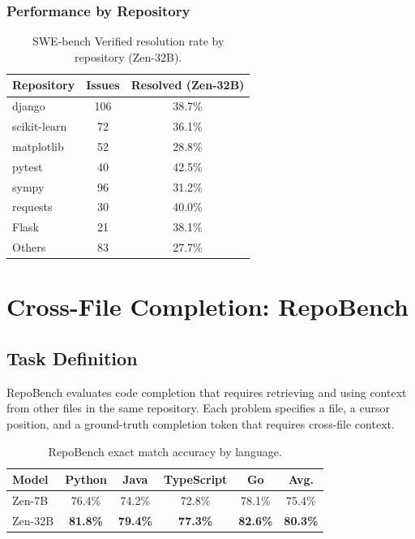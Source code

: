 \documentclass[11pt,a4paper]{article}
\begin{document}
\subsubsection{Performance by Repository}

\begin{table}[H]
\centering
\begin{tabular}{lcc}
\toprule
\textbf{Repository} & \textbf{Issues} & \textbf{Resolved (Zen-32B)} \\
\midrule
django & 106 & 38.7\% \\
scikit-learn & 72 & 36.1\% \\
matplotlib & 52 & 28.8\% \\
pytest & 40 & 42.5\% \\
sympy & 96 & 31.2\% \\
requests & 30 & 40.0\% \\
Flask & 21 & 38.1\% \\
Others & 83 & 27.7\% \\
\bottomrule
\end{tabular}
\caption{SWE-bench Verified resolution rate by repository (Zen-32B).}
\end{table}

\section{Cross-File Completion: RepoBench}

\subsection{Task Definition}

RepoBench evaluates code completion that requires retrieving and using context from
other files in the same repository. Each problem specifies a file, a cursor position,
and a ground-truth completion token that requires cross-file context.

\begin{table}[H]
\centering
\begin{tabular}{lccccc}
\toprule
\textbf{Model} & \textbf{Python} & \textbf{Java} & \textbf{TypeScript} & \textbf{Go} & \textbf{Avg.} \\
\midrule
Zen-7B & 76.4\% & 74.2\% & 72.8\% & 78.1\% & 75.4\% \\
Zen-32B & \textbf{81.8\%} & \textbf{79.4\%} & \textbf{77.3\%} & \textbf{82.6\%} & \textbf{80.3\%} \\
\bottomrule
\end{tabular}
\caption{RepoBench exact match accuracy by language.}
\end{table}
\end{document}
